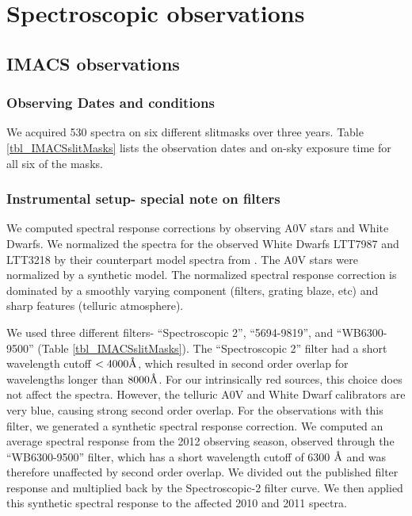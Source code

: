 \section{Spectroscopic observations}

\subsection{IMACS observations}
\subsubsection{Observing Dates and conditions}
We acquired 530 spectra on six different slitmasks over three years.  Table \ref{tbl_IMACSslitMasks} lists the observation dates and on-sky exposure time for all six of the masks.

\subsubsection{Instrumental setup- special note on filters}
We computed spectral response corrections by observing A0V stars and White Dwarfs.  We normalized the spectra for the observed White Dwarfs LTT7987 and LTT3218 by their counterpart model spectra from \citet{2014A&A...568A...9M}.  The A0V stars were normalized by a synthetic model.  The normalized spectral response correction is dominated by a smoothly varying component (filters, grating blaze, etc) and sharp features (telluric atmosphere).

We used three different filters- ``Spectroscopic 2'', ``5694-9819'', and ``WB6300-9500'' (Table \ref{tbl_IMACSslitMasks}).  The ``Spectroscopic 2'' filter had a short wavelength cutoff $<4000 \mbox{\normalfont\AA}$, which resulted in second order overlap for wavelengths longer than $8000 \mbox{\normalfont\AA}$.  For our intrinsically red sources, this choice does not affect the spectra.  However, the telluric A0V and White Dwarf calibrators are very blue, causing strong second order overlap.  For the observations with this filter, we generated a synthetic spectral response correction.  We computed an average spectral response from the 2012 observing season, observed through the ``WB6300-9500'' filter, which has a short wavelength cutoff of 6300 $\mbox{\normalfont\AA}$ and was therefore unaffected by second order overlap.  We divided out the published filter response and multiplied back by the Spectroscopic-2 filter curve.  We then applied this synthetic spectral response to the affected 2010 and 2011 spectra.

